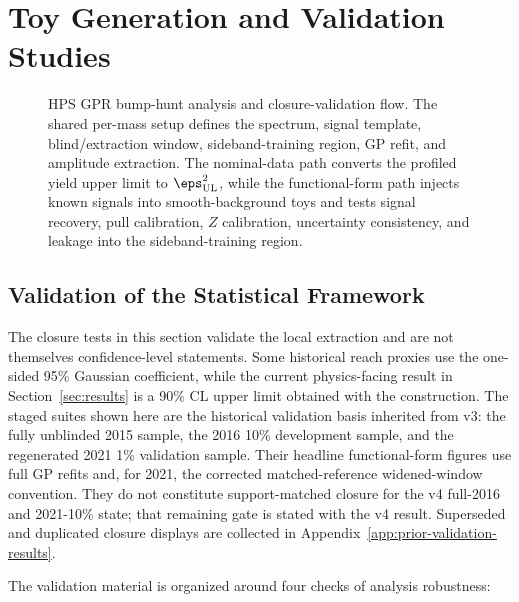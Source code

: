 \section{Toy Generation and Validation Studies}
\label{sec:toys}

\begin{figure}[H]
\centering
{}
\caption{HPS GPR bump-hunt analysis and closure-validation flow. The shared
per-mass setup defines the spectrum, signal template, blind/extraction window,
sideband-training region, GP refit, and amplitude extraction. The nominal-data path
converts the profiled yield upper limit to $\eps^2_{\mathrm{UL}}$, while the
functional-form path injects known signals into smooth-background toys and tests signal
recovery, pull calibration, $Z$ calibration, uncertainty consistency, and leakage into
the sideband-training region.}
\label{fig:hps-gpr-flowchart-section5}
\end{figure}

\subsection{Validation of the Statistical Framework}

The closure tests in this section validate the local extraction and are not themselves
confidence-level statements. Some historical reach proxies use the one-sided 95\%
Gaussian coefficient, while the current physics-facing result in
Section~\ref{sec:results} is a 90\% CL upper limit obtained with the \CLs{} construction.
The staged suites shown here are the historical validation basis inherited from v3:
the fully unblinded 2015 sample, the 2016 10\% development sample, and the regenerated
2021 1\% validation sample. Their headline functional-form figures use full GP refits
and, for 2021, the corrected matched-reference widened-window convention. They do not
constitute support-matched closure for the v4 full-2016 and 2021-10\% state; that
remaining gate is stated with the v4 result. Superseded and duplicated closure
displays are collected in Appendix~\ref{app:prior-validation-results}.

The validation material is organized around four checks of analysis robustness:

